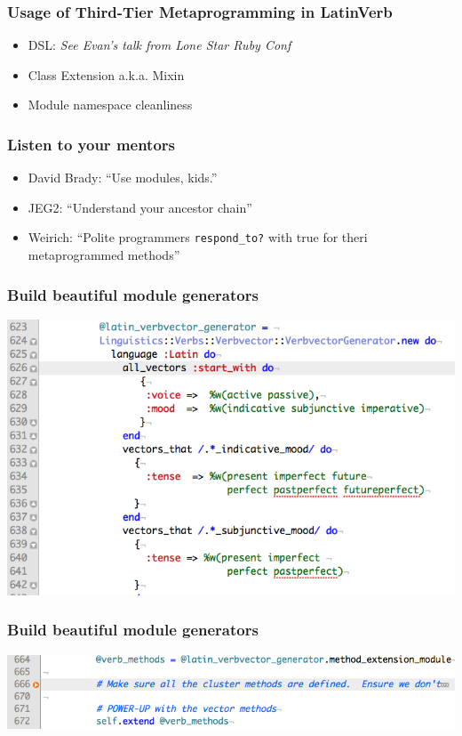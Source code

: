 \documentclass[slidestop,compress,mathserif]{beamer}
\begin{document}
\begin{frame}
	\frametitle{Usage of Third-Tier Metaprogramming in LatinVerb}
	\begin{itemize}
		\item DSL:  \emph{See Evan's talk from Lone Star Ruby Conf}
		\item Class Extension a.k.a. Mixin
		\item Module namespace cleanliness
	\end{itemize}
\end{frame}

\begin{frame}
	\frametitle{Listen to your mentors}
	\begin{itemize}
		\item David Brady:  ``Use modules, kids.''
		\item JEG2:  ``Understand your ancestor chain''
		\item Weirich:  ``Polite programmers \texttt{respond\_to?} with true for theri metaprogrammed methods''
	\end{itemize}
\end{frame}

\begin{frame}
	\frametitle{Build beautiful module generators}
	\begin{center}
		\includegraphics[scale=0.35]{img/ll_dsl.png}
	\end{center}	
\end{frame}

\begin{frame}
	\frametitle{Build beautiful module generators}
	\begin{center}
		\includegraphics[scale=0.35]{img/ll_mod_inc.png}
	\end{center}	
\end{frame}
\end{document}
